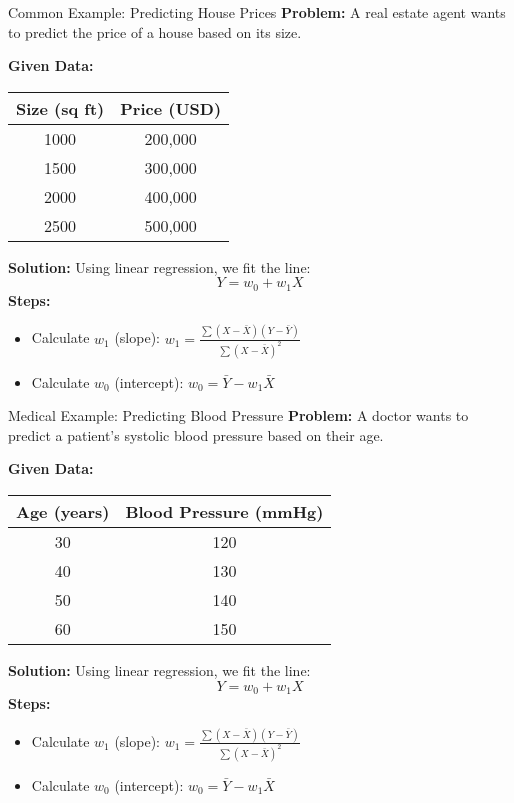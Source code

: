 \documentclass[serif, aspectratio=169]{beamer}
\begin{document}
\begin{frame}{Common Example: Predicting House Prices}
\textbf{Problem:} A real estate agent wants to predict the price of a house based on its size.

\textbf{Given Data:}
\begin{center}
\begin{tabular}{|c|c|}
\hline
Size (sq ft) & Price (USD) \\
\hline
1000 & 200,000 \\
1500 & 300,000 \\
2000 & 400,000 \\
2500 & 500,000 \\
\hline
\end{tabular}
\end{center}

\textbf{Solution:} Using linear regression, we fit the line:
\begin{equation}
Y = w_0 + w_1 X
\end{equation}
\textbf{Steps:}
\begin{itemize}
    \item Calculate $w_1$ (slope): $w_1 = \frac{\sum (X - \bar{X})(Y - \bar{Y})}{\sum (X - \bar{X})^2}$
    \item Calculate $w_0$ (intercept): $w_0 = \bar{Y} - w_1 \bar{X}$
\end{itemize}
\end{frame}

\begin{frame}{Medical Example: Predicting Blood Pressure}
\textbf{Problem:} A doctor wants to predict a patient's systolic blood pressure based on their age.

\textbf{Given Data:}
\begin{center}
\begin{tabular}{|c|c|}
\hline
Age (years) & Blood Pressure (mmHg) \\
\hline
30 & 120 \\
40 & 130 \\
50 & 140 \\
60 & 150 \\
\hline
\end{tabular}
\end{center}

\textbf{Solution:} Using linear regression, we fit the line:
\begin{equation}
Y = w_0 + w_1 X
\end{equation}
\textbf{Steps:}
\begin{itemize}
    \item Calculate $w_1$ (slope): $w_1 = \frac{\sum (X - \bar{X})(Y - \bar{Y})}{\sum (X - \bar{X})^2}$
    \item Calculate $w_0$ (intercept): $w_0 = \bar{Y} - w_1 \bar{X}$
\end{itemize}
\end{frame}
\end{document}
